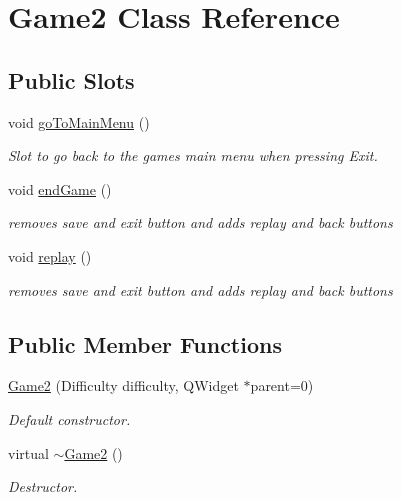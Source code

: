 \hypertarget{classGame2}{\section{\-Game2 \-Class \-Reference}
\label{classGame2}
}
\subsection*{\-Public \-Slots}
\begin{DoxyCompactItemize}
\item 
void \hyperlink{classGame2_a4703d041f8981d8e74b9970968b033d7}{go\-To\-Main\-Menu} ()
\begin{DoxyCompactList}\small\item\em \-Slot to go back to the games main menu when pressing \-Exit. \end{DoxyCompactList}\item 
void \hyperlink{classGame2_a38618590c202d5a3a8adc7aa7a770f0a}{end\-Game} ()
\begin{DoxyCompactList}\small\item\em removes save and exit button and adds replay and back buttons \end{DoxyCompactList}\item 
void \hyperlink{classGame2_a54ec031ce8f63c248862bfa9e2637bf6}{replay} ()
\begin{DoxyCompactList}\small\item\em removes save and exit button and adds replay and back buttons \end{DoxyCompactList}\end{DoxyCompactItemize}
\subsection*{\-Public \-Member \-Functions}
\begin{DoxyCompactItemize}
\item 
\hyperlink{classGame2_ae983deec0de588dc91ab231e091cd7c3}{\-Game2} (\-Difficulty difficulty, \-Q\-Widget $\ast$parent=0)
\begin{DoxyCompactList}\small\item\em \-Default constructor. \end{DoxyCompactList}\item 
virtual \hyperlink{classGame2_a7c8c6d11b9f40a3cf3cc5b87f9a85807}{$\sim$\-Game2} ()
\begin{DoxyCompactList}\small\item\em \-Destructor. \end{DoxyCompactList}\end{DoxyCompactItemize}


